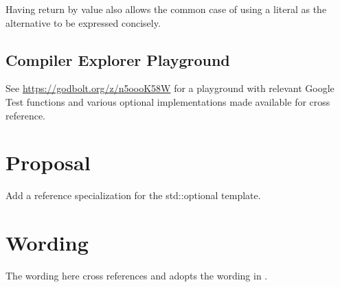 \documentclass[a4paper,10pt,oneside,openany,final,article]{memoir}
\begin{document}
Having  return by value also allows the common case of using a literal as the alternative to be expressed concisely.

\section{Compiler Explorer Playground}

See \url{https://godbolt.org/z/n5oooK58W} for a playground with relevant Google Test functions and various optional implementations made available for cross reference.

\chapter{Proposal}

Add a reference specialization for the std::optional template.

\chapter{Wording}

The wording here cross references and adopts the wording in \cite{P3091R2}.
\end{document}
